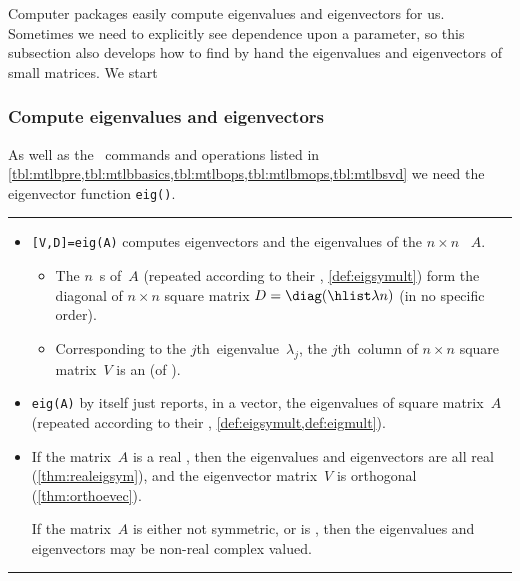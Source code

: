 Computer packages easily compute eigenvalues and eigenvectors for us.
Sometimes we need to explicitly see dependence upon a parameter, so this subsection also develops how to find by hand the eigenvalues and eigenvectors of small matrices.
We start 


\subsubsection{Compute eigenvalues and eigenvectors}
\label{sec:cee}

\begin{table}
\caption{As well as the \script\ commands and operations listed in \cref{tbl:mtlbpre,tbl:mtlbbasics,tbl:mtlbops,tbl:mtlbmops,tbl:mtlbsvd}  we need the eigenvector function \texttt{eig()}.} \label{tbl:mtlbeig}
\smallskip\hrule\smallskip
\begin{minipage}{\linewidth}
\begin{itemize}
\item {}\verb|[V,D]=eig(A)| computes eigenvectors and the eigenvalues of the  \(n\times n\) ~\(A\).
\begin{itemize}
\item The \(n\)~s of~\(A\) (repeated according to their , \cref{def:eigsymult}) form the diagonal of \(n\times n\) square matrix \(D=\diag(\hlist\lambda n)\) (in no specific order).
\item Corresponding to the \(j\)th~eigenvalue~\(\lambda_j\), the 
\(j\)th~column of \(n\times n\) square matrix~\(V\) is an 
 (of ).
\end{itemize}
\item \verb|eig(A)| by itself just reports, in a vector, the eigenvalues of square matrix~\(A\) (repeated according to their  , \cref{def:eigsymult,def:eigmult}).

\item If the matrix~\(A\) is a real , then the eigenvalues and eigenvectors are all real (\cref{thm:realeigsym}), and the eigenvector matrix~\(V\) is orthogonal (\cref{thm:orthoevec}).

If the matrix~\(A\) is either not symmetric, or is , then the eigenvalues and eigenvectors may be non-real complex valued.

\end{itemize}
\end{minipage}
\smallskip\hrule
\end{table}


